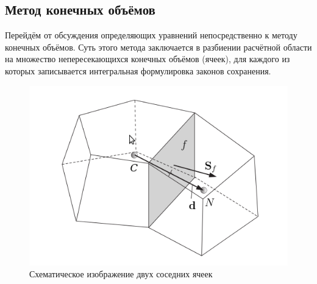 	\subsection{Метод конечных объёмов}
		Перейдём от обсуждения определяющих уравнений непосредственно к методу конечных объёмов. Суть этого метода заключается в разбиении расчётной области на множество непересекающихся конечных объёмов (ячеек), для каждого из которых записывается интегральная формулировка законов сохранения.
		\begin{figure}[h]
			\centering
			\includegraphics[scale=0.5]{twoCells}
			\caption{Схематическое изображение двух соседних ячеек}
			\label{fig:twoCells}
		\end{figure}
		\clearpage
